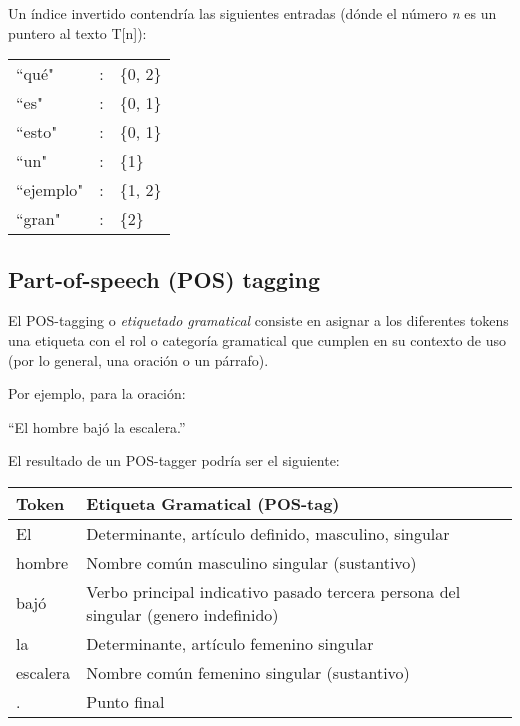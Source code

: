 Un \'indice invertido contendr\'ia las siguientes entradas (d\'onde el n\'umero \textit{n} es un puntero al texto T[n]):
\medskip %

\begin{tabular}{lll}
	``qu\'e" & : & \{0, 2\}\\
	``es" &:& \{0, 1\}\\
	``esto" & :& \{0, 1\} \\
	``un" & :&   \{1\} \\
	``ejemplo" & :& \{1, 2\} \\
	``gran" & :& \{2\} \\
\end{tabular}
\medskip



\subsection{Part-of-speech (POS) tagging}

El POS-tagging o \textit{etiquetado gramatical} consiste en asignar a los diferentes 
tokens una etiqueta con el rol o categor\'ia gramatical que cumplen en su contexto de uso (por lo general, una oraci\'on o un p\'arrafo). 
\newline

Por ejemplo, para la oraci\'on:

\medskip

\begin{center}
{\textquotedblleft}El hombre baj\'o la escalera.{\textquotedblright} 
\end{center}
\medskip

El resultado de un POS-tagger podr\'ia ser el siguiente:
\newline

\begin{tabular}{| l | l |}
 \hline
Token & Etiqueta Gramatical (POS-tag) \\ \hline
El  & Determinante, art\'iculo definido, masculino, singular\\ \hline
hombre &  Nombre com\'un masculino singular (sustantivo) \\ \hline
baj\'o  & Verbo principal indicativo pasado tercera persona del singular (genero indefinido)\\ \hline
la  & Determinante, art\'iculo femenino singular \\ \hline
escalera & Nombre com\'un femenino singular (sustantivo) \\ \hline
.  & Punto final\\ \hline
\end{tabular}


